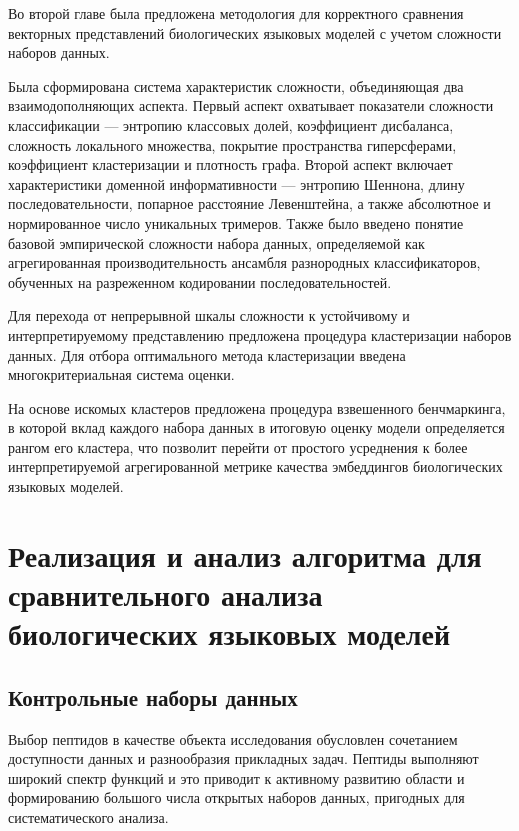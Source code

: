 \documentclass[specification,annotation,times]{itmo-student-thesis}
\begin{document}
\chapterconclusion

Во второй главе была предложена методология для корректного сравнения векторных представлений биологических языковых моделей 
с учетом сложности наборов данных.

Была сформирована система характеристик сложности, объединяющая два взаимодополняющих аспекта. 
Первый аспект охватывает показатели сложности классификации — энтропию классовых долей, коэффициент дисбаланса, 
сложность локального множества, покрытие пространства гиперсферами, коэффициент кластеризации и плотность графа. 
Второй аспект включает характеристики доменной информативности — энтропию Шеннона, длину последовательности, попарное расстояние Левенштейна, 
а также абсолютное и нормированное число уникальных тримеров. 
Также было введено понятие базовой эмпирической сложности набора данных, определяемой как агрегированная 
производительность ансамбля разнородных классификаторов, обученных на разреженном кодировании последовательностей. 

Для перехода от непрерывной шкалы сложности к устойчивому и интерпретируемому представлению 
предложена процедура кластеризации наборов данных. 
Для отбора оптимального метода кластеризации введена многокритериальная система оценки.

На основе искомых кластеров предложена процедура взвешенного бенчмаркинга, 
в которой вклад каждого набора данных в итоговую оценку модели определяется рангом его кластера, 
что позволит перейти от простого усреднения к более интерпретируемой агрегированной метрике качества эмбеддингов биологических языковых моделей.

\chapter{Реализация и анализ алгоритма для сравнительного анализа биологических языковых моделей}



\section{Контрольные наборы данных}

Выбор пептидов в качестве объекта исследования обусловлен сочетанием доступности данных и разнообразия прикладных задач. Пептиды выполняют широкий спектр функций и это приводит к активному развитию области и формированию большого числа открытых наборов данных, пригодных для систематического анализа.
\end{document}

